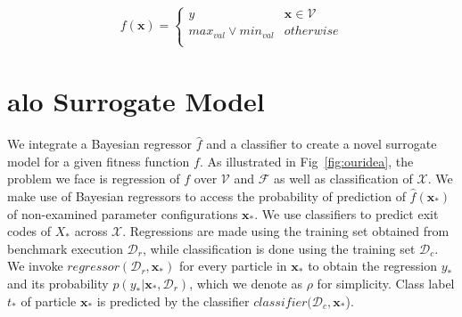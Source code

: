 \documentclass[runningheads,a4paper]{llncs}
\begin{document}
\begin{align} 
\label{eq:fitnessdef}
f(\mathbf{x}) =
\begin{cases}
y & \mathbf{x} \in \mathcal{V}  \\
max_{val} \vee min_{val}& otherwise  \\
\end{cases}
\end{align} 




\section{\ac{alo} Surrogate Model}
\label{surrogatemodels}

%
We integrate a Bayesian regressor $\hat{f}$ and a classifier to create a novel surrogate model for a given fitness function $f$. As illustrated in Fig~\ref{fig:ouridea}, the problem we face is regression of $f$ over $\mathcal{V}$ and $\mathcal{F}$ as well as classification of $\mathcal{X}$. We make use of Bayesian regressors to access the probability of prediction of $\hat{f}(\mathbf{x_*})$ of non-examined parameter configurations $\mathbf{x_*}$. We use classifiers to predict exit codes of $X_*$ across $\mathcal{X}$. Regressions are made using the training set obtained from benchmark execution $\mathcal{D}_{r}$, while classification is done using the training set $\mathcal{D}_{c}$. We invoke $regressor(\mathcal{D}_{r},\mathbf{x_*})$ for every particle in $\mathbf{x_*}$ to obtain the regression $y_*$ and its probability $p(y_* | \mathbf{x_*},\mathcal{D}_{r})$, which we denote as $\rho$ for simplicity. Class label $t_*$ of particle $\mathbf{x_*}$ is predicted by the classifier $classifier(\mathcal{D}_{c},\mathbf{x_*}$). 
\end{document}
